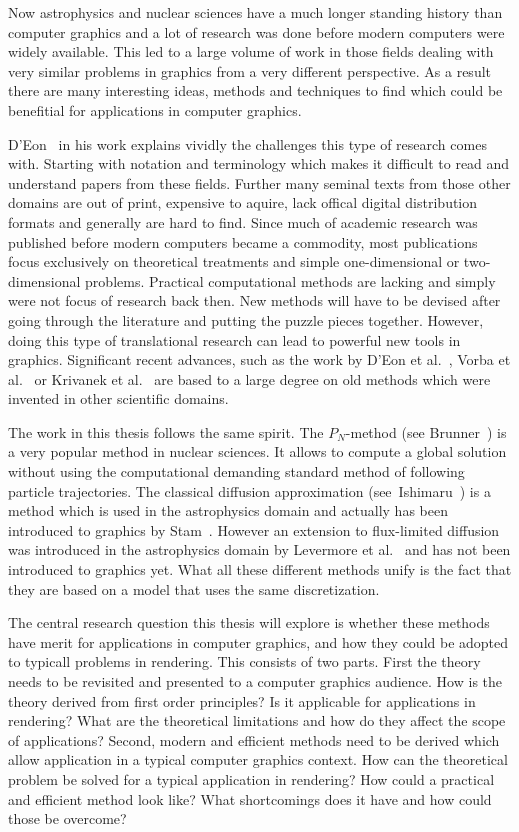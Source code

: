 Now astrophysics and nuclear sciences have a much longer standing history than computer graphics and a lot of research was done before modern computers were widely available. This led to a large volume of work in those fields dealing with very similar problems in graphics from a very different perspective. As a result there are many interesting ideas, methods and techniques to find which could be benefitial for applications in computer graphics.

D'Eon~\cite{DEon14} in his work explains vividly the challenges this type of research comes with. Starting with notation and terminology which makes it difficult to read and understand papers from these fields. Further many seminal texts from those other domains are out of print, expensive to aquire, lack offical digital distribution formats and generally are hard to find. Since much of academic research was published before modern computers became a commodity, most publications focus exclusively on theoretical treatments and simple one-dimensional or two-dimensional problems. Practical computational methods are lacking and simply were not focus of research back then. New methods will have to be devised after going through the literature and putting the puzzle pieces together. However, doing this type of translational research can lead to powerful new tools in graphics. Significant recent advances, such as the work by D'Eon et al.~\cite{dEon11}, Vorba et al.~\cite{Vorba16} or Krivanek et al.~\cite{Krivanek14} are based to a large degree on old methods which were invented in other scientific domains.

The work in this thesis follows the same spirit. The $P_N$-method (see Brunner~\cite{Brunner02}) is a very popular method in nuclear sciences. It allows to compute a global solution without using the computational demanding standard method of following particle trajectories. The classical diffusion approximation (see~Ishimaru~\cite{Ishimaru78}) is a method which is used in the astrophysics domain and actually has been introduced to graphics by Stam~\cite{Stam95}. However an extension to flux-limited diffusion was introduced in the astrophysics domain by Levermore et al.~\cite{Levermore81} and has not been introduced to graphics yet. What all these different methods unify is the fact that they are based on a model that uses the same discretization.

The central research question this thesis will explore is whether these methods have merit for applications in computer graphics, and how they could be adopted to typicall problems in rendering. This consists of two parts. First the theory needs to be revisited and presented to a computer graphics audience. How is the theory derived from first order principles? Is it applicable for applications in rendering? What are the theoretical limitations and how do they affect the scope of applications? Second, modern and efficient methods need to be derived which allow application in a typical computer graphics context. How can the theoretical problem be solved for a typical application in rendering? How could a practical and efficient method look like? What shortcomings does it have and how could those be overcome?

